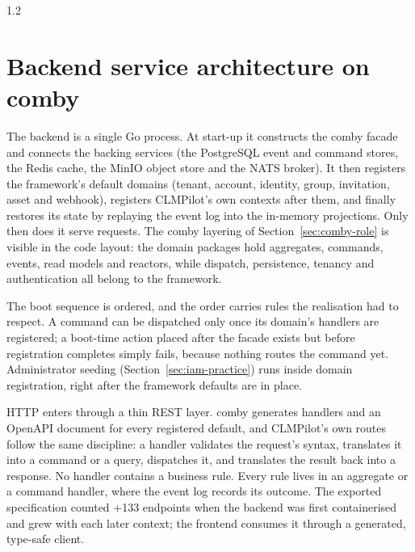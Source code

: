 \begin{spacing}{1.2}
\section{Backend service architecture on comby}
\label{sec:backend-comby}

The backend is a single Go process. At start-up it constructs the comby
facade and connects the backing services (the PostgreSQL event and
command stores, the Redis cache, the MinIO object store and the NATS
broker). It then registers the framework's default domains (tenant,
account, identity, group, invitation, asset and webhook), registers
CLMPilot's own contexts after them, and finally restores its state by
replaying the event log into the in-memory projections. Only then does
it serve requests. The comby layering of Section~\ref{sec:comby-role} is
visible in the code layout: the domain packages hold aggregates,
commands, events, read models and reactors, while dispatch, persistence,
tenancy and authentication all belong to the framework.

The boot sequence is ordered, and the order carries rules the
realisation had to respect. A command can be dispatched only once its
domain's handlers are registered; a boot-time action placed after the
facade exists but before registration completes simply fails, because
nothing routes the command yet. Administrator seeding
(Section~\ref{sec:iam-practice}) runs inside domain registration, right
after the framework defaults are in place.

HTTP enters through a thin REST layer. comby generates handlers and an
OpenAPI document for every registered default, and CLMPilot's own routes
follow the same discipline: a handler validates the request's syntax,
translates it into a command or a query, dispatches it, and translates
the result back into a response. No handler contains a business rule.
Every rule lives in an aggregate or a command handler, where the event
log records its outcome. The exported specification counted +133
endpoints when the backend was first containerised and grew with each
later context; the frontend consumes it through a generated, type-safe
client.


\end{spacing}
